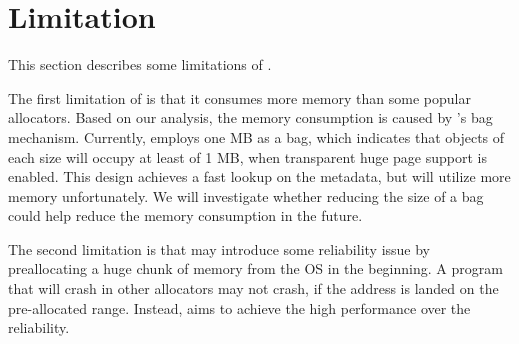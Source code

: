 \section{Limitation}
\label{sec:limit}

This section describes some limitations of \NM{}. 

The first limitation of \NM{} is that it consumes more memory than some popular allocators. Based on our analysis, the memory consumption is caused by \NM{}'s bag mechanism. Currently, \NM{} employs one MB as a bag, which indicates that objects of each size will occupy at least of 1 MB, when transparent huge page support is enabled. This design achieves a fast lookup on the metadata, but will utilize more memory unfortunately. We will investigate whether reducing the size of a bag could help reduce the memory consumption in the future.

The second limitation is that \NM{} may introduce some reliability issue by preallocating a huge chunk of memory from the OS in the beginning. A program that will crash in other allocators may not crash, if the address is landed on the pre-allocated range. Instead, \NM{} aims to achieve the high performance over the reliability. 
